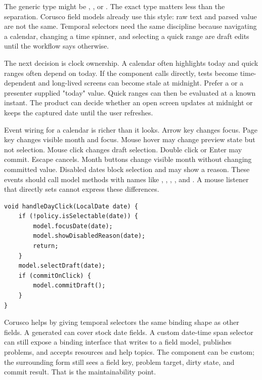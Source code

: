 The generic type might be
, ,
or
. The exact type matters less than the separation.
Corusco field models already use this style: raw text and parsed value are not the same.
Temporal selectors need the same discipline because navigating a calendar, changing a
time spinner, and selecting a quick range are draft edits until the workflow says
otherwise.

The next decision is clock ownership. A calendar often highlights today and quick ranges
often depend on today. If the component calls
 directly, tests become time-dependent and long-lived
screens can become stale at midnight. Prefer a  or a presenter supplied
"today" value. Quick ranges can then be evaluated at a known instant. The product can
decide whether an open screen updates at midnight or keeps the captured date until the
user refreshes.

Event wiring for a calendar is richer than it looks. Arrow key changes focus. Page key
changes visible month and focus. Mouse hover may change preview state but not selection.
Mouse click changes draft selection. Double click or Enter may commit. Escape cancels.
Month buttons change visible month without changing committed value. Disabled dates
block selection and may show a reason. These events should call model methods with names
like
, , , , and
. A mouse listener that directly sets 
cannot express these differences.

\begin{lstlisting}[caption={Calendar events should call named model operations.}]
void handleDayClick(LocalDate date) {
    if (!policy.isSelectable(date)) {
        model.focusDate(date);
        model.showDisabledReason(date);
        return;
    }
    model.selectDraft(date);
    if (commitOnClick) {
        model.commitDraft();
    }
}
\end{lstlisting}

Corusco helps by giving temporal selectors the same binding shape as other fields. A
generated  can cover stock date fields. A custom date-time span selector
can still expose a binding interface that writes to a field model, publishes problems,
and accepts resources and help topics. The component can be custom; the surrounding form
still sees a field key, problem target, dirty state, and commit result. That is the
maintainability point.

